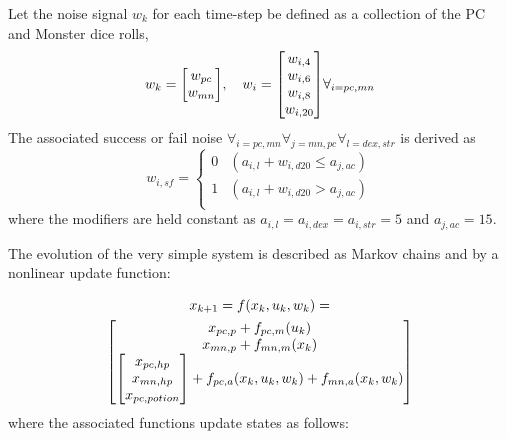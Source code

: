 \documentclass[letterpaper, 10 pt, conference]{ieeeconf}
\begin{document}
Let the noise signal $w_k$ for each time-step be defined as a collection of the PC and Monster dice rolls, \[
    w_k = \mqty[w_{pc} \\ w_{mn}], \quad w_{i} = \mqty[w_{i,4} \\ w_{i,6} \\ w_{i,8} \\ w_{i,20}] \forall_{i = pc,mn}
\]The associated success or fail noise $\forall_{i=pc,mn} \forall_{j=mn,pc} \forall_{l = dex,str}$ is derived as \[
    w_{i,sf} = \begin{cases}
        0 & (a_{i,l} + w_{i,d20} \leq a_{j,ac})\\
        1 & (a_{i,l} + w_{i,d20} > a_{j,ac})\\
    \end{cases}
\] where the modifiers are held constant as $a_{i,l} = a_{i,dex} = a_{i,str} = 5$ and $a_{j,ac} = 15$.

\pagebreak
The evolution of the very simple system is described as Markov chains and by a nonlinear update function:

\begin{multline}
    x_{k+1} = f(x_k, u_k, w_k) 
    = \\ \mqty[
        x_{pc,p} + f_{pc,m}(u_k)\\
        x_{mn,p} + f_{mn,m}(x_k)\\
        \mqty[x_{pc,hp}\\ x_{mn,hp} \\ x_{pc,potion}] + f_{pc,a}(x_k,u_k,w_k) + f_{mn,a}(x_k,w_k)
    ]
\end{multline} where the associated functions update states as follows: 
\end{document}
